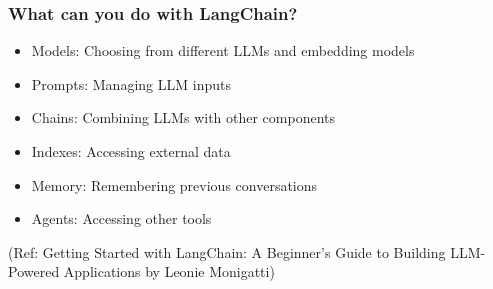 





\begin{frame}[fragile]\frametitle{What can you do with LangChain?}

\begin{itemize}
\item Models: Choosing from different LLMs and embedding models
\item Prompts: Managing LLM inputs
\item Chains: Combining LLMs with other components
\item Indexes: Accessing external data
\item Memory: Remembering previous conversations
\item Agents: Accessing other tools
\end{itemize}

{\tiny (Ref: Getting Started with LangChain: A Beginner’s Guide to Building LLM-Powered Applications by Leonie Monigatti)}

\end{frame}


